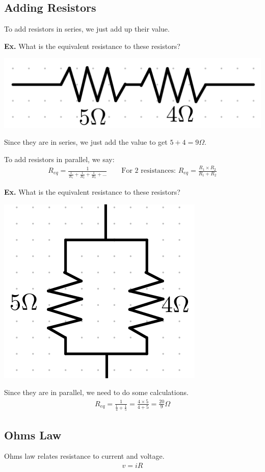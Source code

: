 \documentclass[12pt,letterpaper]{article} \usepackage{amsmath} \usepackage{graphicx} \usepackage[margin=1in]{geometry} \usepackage{longtable}  \usepackage{amssymb}
\begin{document}
	\subsection{Adding Resistors}
	To add resistors in series, we just add up their value.
	\begin{mdframed}[]
	\textbf{Ex.} What is the equivalent resistance to these resistors?
	\begin{center}
		\includegraphics[width=0.3\linewidth]{ex6}
	\end{center}
	Since they are in series, we just add the value to get $5+4=9\Omega$.
	\end{mdframed}

	To add resistors in parallel, we say: 
	\begin{align*}
		R_{eq} = \frac{1}{\frac{1}{R_1} + \frac{1}{R_2} + \frac{1}{R_3} + ...} \qquad \text{For 2 resistances: } R_{eq} = \frac{R_1\times R_2}{R_1+R_2}
	\end{align*}

	\begin{mdframed}[]
		\textbf{Ex.} What is the equivalent resistance to these resistors?
		\begin{center}
			\includegraphics[width=0.2\linewidth]{ex7}
		\end{center}
		Since they are in parallel, we need to do some calculations.
		\begin{align*}
			R_{eq} = \frac{1}{\frac{1}{4}+\frac{1}{5}} = \frac{4\times 5}{4+5} = \frac{20}{9}\Omega
		\end{align*}
	\end{mdframed}


	
	\subsection{Ohms Law}
	Ohms law relates resistance to current and voltage. 
	\begin{align*}
		v=iR
	\end{align*}
\end{document}
